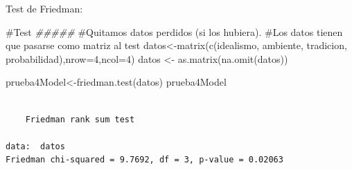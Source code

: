 \documentclass[
  ignorenonframetext,
]{beamer}
\newenvironment{Shaded}{\begin{snugshade}}{\end{snugshade}}
\newcommand{\AttributeTok}[1]{\textcolor[rgb]{0.40,0.45,0.13}{#1}}
\newcommand{\CommentTok}[1]{\textcolor[rgb]{0.37,0.37,0.37}{#1}}
\newcommand{\DecValTok}[1]{\textcolor[rgb]{0.68,0.00,0.00}{#1}}
\newcommand{\DocumentationTok}[1]{\textcolor[rgb]{0.37,0.37,0.37}{\textit{#1}}}
\newcommand{\FunctionTok}[1]{\textcolor[rgb]{0.28,0.35,0.67}{#1}}
\newcommand{\NormalTok}[1]{\textcolor[rgb]{0.00,0.23,0.31}{#1}}
\newcommand{\OtherTok}[1]{\textcolor[rgb]{0.00,0.23,0.31}{#1}}
\newcommand{\SpecialCharTok}[1]{\textcolor[rgb]{0.37,0.37,0.37}{#1}}
\begin{document}
\begin{frame}[fragile]
\begin{block}{Test de Friedman:}
\label{test-de-friedman}
\begin{Shaded}
\begin{Highlighting}[]
\CommentTok{\#Test}
\DocumentationTok{\#\#\#\#\#}
\CommentTok{\#Quitamos datos perdidos (si los hubiera).}
\CommentTok{\#Los datos tienen que pasarse como matriz al test}
\NormalTok{datos}\OtherTok{\textless{}{-}}\FunctionTok{matrix}\NormalTok{(}\FunctionTok{c}\NormalTok{(idealismo, ambiente, tradicion, probabilidad),}\AttributeTok{nrow=}\DecValTok{4}\NormalTok{,}\AttributeTok{ncol=}\DecValTok{4}\NormalTok{)}
\NormalTok{datos }\OtherTok{\textless{}{-}} \FunctionTok{as.matrix}\NormalTok{(}\FunctionTok{na.omit}\NormalTok{(datos))}

\NormalTok{prueba4Model}\OtherTok{\textless{}{-}}\FunctionTok{friedman.test}\NormalTok{(datos)}
\NormalTok{prueba4Model}
\end{Highlighting}
\end{Shaded}

\begin{verbatim}

    Friedman rank sum test

data:  datos
Friedman chi-squared = 9.7692, df = 3, p-value = 0.02063
\end{verbatim}

\begin{Shaded}
\end{Shaded}
\end{block}
\end{frame}
\end{document}
